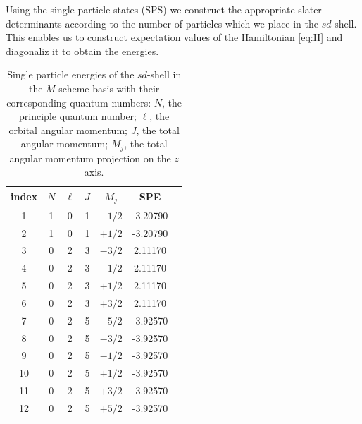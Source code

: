 \documentclass[aps,prl,reprint,groupedaddress]{revtex4-1}  %
\begin{document}
Using the single-particle states (SPS) we construct the appropriate slater determinants according to the number of particles which we place in the $sd$-shell. This enables us to construct expectation values of the Hamiltonian \eqref{eq:H} and diagonaliz it to obtain the energies. 

\begin{table}[H]
\caption{Single particle energies of the $sd$-shell in the $M$-scheme basis with their corresponding quantum numbers: $N$, the principle quantum number; $\ell$, the orbital angular momentum; $J$, the total angular momentum; $M_j$, the total angular momentum projection on the $z$ axis. \label{tab:SPE}}
\begin{ruledtabular}
\begin{tabular}{c|cccccc}
index	&	$N$	&	$\ell$	&	$J$	&	$M_j$	&	SPE			\\
\hline 
1		&	1	&	0		&	1	&	$-1/2$	&	-3.20790	\\
2		&	1	&	0		&	1	&	$+1/2$	&	-3.20790	\\
3		& 	0	&	2		&	3	&	$-3/2$	&	 2.11170	\\
4		&	0	&	2		&	3	&	$-1/2$	&	 2.11170	\\
5		&	0	&	2		&	3	&	$+1/2$	&	 2.11170	\\
6		&	0	&	2		&	3	&	$+3/2$	&	 2.11170	\\
7		&	0	&	2		&	5	&	$-5/2$	&	-3.92570	\\
8		&	0	&	2		&	5	&	$-3/2$	&	-3.92570	\\
9		&	0	&	2		&	5	&	$-1/2$	&	-3.92570	\\
10		&	0	&	2		&	5	&	$+1/2$	&	-3.92570	\\
11		&	0	&	2		&	5	&	$+3/2$	&	-3.92570	\\
12		&	0	&	2		&	5	&	$+5/2$	&	-3.92570	
\end{tabular}
\end{ruledtabular}
\end{table}
\end{document}
